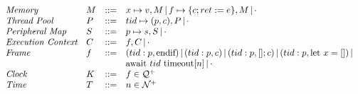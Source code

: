 \[
\begin{array}{llcl}
\textit{Memory} & M & ::= & x \mapsto v, M \,|\, f \mapsto \{c; ret := e\}, M \,|\, \cdot
\\
\textit{Thread Pool} & P & ::= & tid \mapsto (p, c), P \,|\, \cdot
\\
\textit{Peripheral Map} & S & ::= & p \mapsto s, S \,|\, \cdot
\\
\textit{Execution Context} & C & ::= & f, C \,|\, \cdot
\\
\textit{Frame} & f & ::= & (tid : p, \text{endif}) \,|\, (tid: p, c) \,|\, (tid : p, []; c) \,|\, (tid : p, \text{let }x = []) \,|\, \\
& & & \text{await } tid \text{ timeout}[n] \,|\, \cdot
\\
\textit{Clock} & K & ::= & f \in \mathcal{Q^+}
\\
\textit{Time} & T & ::= & n \in \mathcal{N^+}
\end{array}
\]


